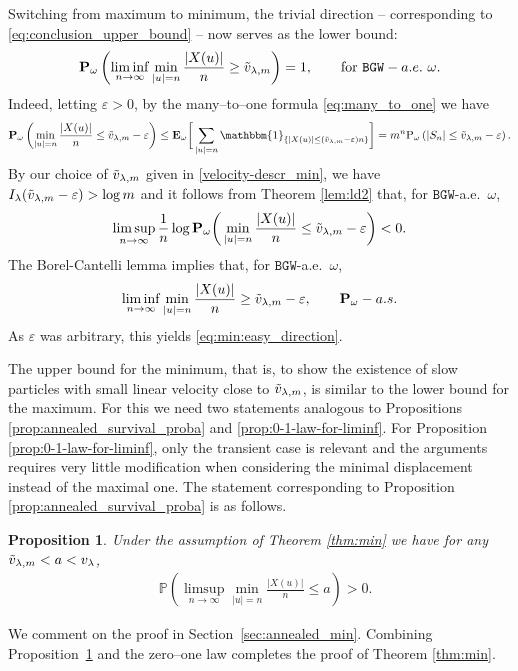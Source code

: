 \documentclass[11 pt]{article}
\newtheorem{proposition}[theorem]{Proposition}
\theoremstyle{definition}
\numberwithin{equation}{section}
\newcommand{\ind}[1]{\mathbbm{1}_{\left\{ #1 \right\} } } %
\newcommand{\PP}{\mathbb{P}} %
\newcommand{\Pw}{\mathbf{P}_{\omega}} %
\newcommand{\Ew}{\mathbf{E}_{\omega}} %
\newcommand{\Pws}{\mathrm{P}_{\omega}} %
\newcommand{\eps}{\varepsilon}
\begin{document}
 Switching from maximum to minimum, the trivial direction -- corresponding to \eqref{eq:conclusion_upper_bound} -- now serves as the lower bound: 
\begin{equation}\label{eq:min:easy_direction}
	\Pw\left( \liminf_{n\to\infty} \min_{\vert u \vert =n} \frac{\vert X(u) \vert}{ n}\geq \Tilde{v}_{\lambda,m} \right)=1, \qquad \text{for} ~ \mathtt{BGW}-a.e. \ \omega.
\end{equation}
Indeed, letting $\varepsilon > 0$, by the many--to--one formula \eqref{eq:many_to_one} we have 
\begin{equation*}
	\Pw\left( \min_{|u|=n} \frac{\vert X(u) \vert }{n}\leq \Tilde{v}_{\lambda,m}- \eps \right) \le  \Ew \bigg[\sum_{|u|=n} \ind{|X(u)|\leq  (\Tilde{v}_{\lambda,m} -\eps)n} \bigg] =  m^n \Pws\left( |S_n|\leq \Tilde{v}_{\lambda,m} -\eps \right).    
\end{equation*}
By our choice of $\Tilde{v}_{\lambda,m}$ given in \eqref{velocity-descr_min}, we have $I_{\lambda}(\Tilde{v}_{\lambda,m}-\eps)>\log m$ and it follows from Theorem \ref{lem:ld2} that, for $\mathtt{BGW}$-a.e.\ $\omega$, 
\[
\limsup_{n\to \infty} \frac{1}{n} \log \Pw\bigg( \min_{|u|=n} \frac{\vert X(u) \vert }{n}\leq  \Tilde{v}_{\lambda,m} - \eps \bigg) < 0.
\]
The Borel-Cantelli lemma implies that, for $\mathtt{BGW}$-a.e.\ $\omega$,
\begin{equation*}
	\liminf_{n \to \infty} \min_{|u|=n} \frac{\vert X(u) \vert }{n} \geq  \Tilde{v}_{\lambda,m}-\eps, \qquad \Pw-a.s.
\end{equation*}
As $\eps$ was arbitrary, this yields \eqref{eq:min:easy_direction}.

The upper bound for the minimum, that is, to show the existence of slow particles with small linear velocity close to $\Tilde{v}_{\lambda,m}$, is similar to the lower bound for the maximum. For this we need two statements analogous to Propositions \ref{prop:annealed_survival_proba} and \ref{prop:0-1-law-for-liminf}. For Proposition \ref{prop:0-1-law-for-liminf}, only the transient case is relevant and the arguments requires very little modification when considering the minimal displacement instead of the maximal one. 
The statement  corresponding to Proposition \ref{prop:annealed_survival_proba} is as follows. 
\begin{proposition}\label{prop:annealed_survival_proba-min}
	Under the assumption of Theorem \ref{thm:min} we have for any $\Tilde{v}_{\lambda,m}< a < v_\lambda$, 
	\begin{align*}
		&\PP \left( \limsup_{n\to\infty} \min_{\vert u \vert = n} \frac{\vert X(u) \vert}{n} \le a\right) > 0.
	\end{align*}
\end{proposition}	
We comment on the proof in Section~\ref{sec:annealed_min}. Combining Proposition~\ref{prop:annealed_survival_proba-min} and the zero--one law  completes the proof of Theorem \ref{thm:min}.  
\end{document}
